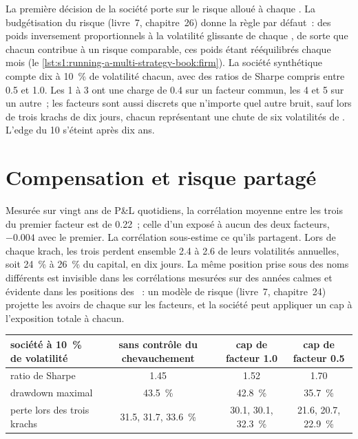 La première décision de la société porte sur le risque alloué à chaque . La budgétisation du risque (livre~7, chapitre~26) donne la règle par défaut~: des poids inversement proportionnels à la volatilité glissante de chaque
, de sorte que chacun contribue à un risque comparable, ces poids étant rééquilibrés chaque mois (le \cref{lst:s1:running-a-multi-strategy-book:firm}). La société synthétique
compte dix  à 10~\% de volatilité chacun, avec des ratios de Sharpe compris entre 0.5 et 1.0. Les  1 à 3 ont une charge de 0.4 sur un facteur commun, les  4 et 5 sur un autre~; les
facteurs sont aussi discrets que n'importe quel autre bruit, sauf lors de trois krachs de dix jours, chacun représentant une chute de six volatilités de . L'edge du  10 s'éteint après dix ans.

\section{Compensation et risque partagé}

Mesurée sur vingt ans de P\&L quotidiens, la corrélation moyenne entre les trois  du premier facteur est de 0.22~; celle d'un  exposé à aucun des deux facteurs, $-0.004$
avec le premier. La corrélation sous-estime ce qu'ils partagent. Lors de chaque krach, les trois  perdent ensemble 2.4 à 2.6 de leurs volatilités annuelles, soit 24~\% à
26~\% du capital, en dix jours. La même position prise sous des noms différents est invisible dans les corrélations mesurées sur des années calmes et évidente dans les
positions des ~: un modèle de risque (livre~7, chapitre~24) projette les avoirs de chaque  sur les facteurs, et la société peut appliquer un cap à l'exposition totale à chacun.

\begin{center}
\small
\begin{tabular}{@{}lccc@{}}
\toprule
société à 10~\% de volatilité & sans contrôle du chevauchement & cap de facteur 1.0 & cap de facteur 0.5\\
\midrule
ratio de Sharpe & 1.45 & 1.52 & 1.70\\
drawdown maximal & 43.5~\% & 42.8~\% & 35.7~\%\\
perte lors des trois krachs & 31.5, 31.7, 33.6~\% & 30.1, 30.1, 32.3~\% & 21.6, 20.7, 22.9~\%\\
\bottomrule
\end{tabular}
\end{center}

